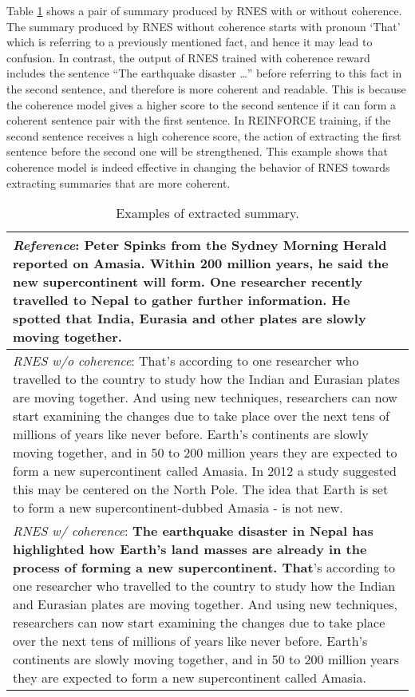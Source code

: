 \documentclass[letterpaper]{article} \usepackage{aaai18}  \usepackage{times}  \usepackage{helvet}  \usepackage{courier}  \usepackage{url}  \usepackage{graphicx}  \usepackage{amssymb}
\begin{document}
	Table \ref{tab:summary_examples} shows a pair of summary produced by RNES with or without coherence. The summary produced by RNES without coherence starts with pronoun `That' which is referring to a previously mentioned fact, and hence it may lead to confusion. In contrast, the output of RNES trained with coherence reward includes the sentence ``The earthquake disaster \dots'' before referring to this fact in the second sentence, and therefore is more coherent and readable. This is because the coherence model gives a higher score to the second sentence if it can form a coherent sentence pair with the first sentence. In REINFORCE training, if the second sentence receives a high coherence score, the action of extracting the first sentence before the second one will be strengthened. This example shows that coherence model is indeed effective in changing the behavior of RNES towards extracting summaries that are more coherent.
		
\begin{table}[ht]
		\centering
		\caption{Examples of extracted summary.}
		\label{tab:summary_examples}
		
		\begin{tabular}{|p{80mm}|}
			\hline
			\small{\textit{Reference}: Peter Spinks from the Sydney Morning Herald reported on Amasia. Within 200 million years, he said the new supercontinent will form. One researcher recently travelled to Nepal to gather further information. He spotted that India, Eurasia and other plates are slowly moving together.} \\\hline
			
			\small{\textit{RNES w/o coherence}: That's according to one researcher who travelled to the country to study how the Indian and Eurasian plates are moving together. And using new techniques, researchers can now start examining the changes due to take place over the next tens of millions of years like never before. Earth's continents are slowly moving together, and in 50 to 200 million years they are expected to form a new supercontinent called Amasia. In 2012 a study suggested this may be centered on the North Pole. The idea that Earth is set to form a new supercontinent-dubbed Amasia - is not new.}\\\hline

			\small{\textit{RNES w/ coherence}: \textbf{The earthquake disaster in Nepal has highlighted how Earth's land masses are already in the process of forming a new supercontinent. That}'s according to one researcher who travelled to the country to study how the Indian and Eurasian plates are moving together. And using new techniques, researchers can now start examining the changes due to take place over the next tens of millions of years like never before. Earth's continents are slowly moving together, and in 50 to 200 million years they are expected to form a new supercontinent called Amasia.} \\
			\hline
		\end{tabular}
	\end{table}
\end{document}
